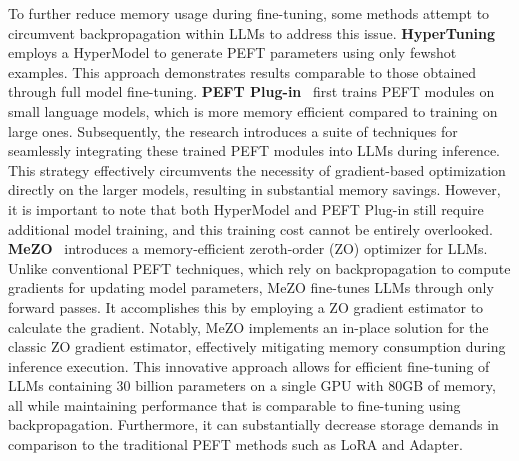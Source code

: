 To further reduce memory usage during fine-tuning, some methods attempt to circumvent backpropagation within LLMs to address this issue. \textbf{HyperTuning}~\cite{hyper-tuning} employs a HyperModel to generate PEFT parameters using only fewshot examples. This approach demonstrates results comparable to those obtained through full model fine-tuning. 
\textbf{PEFT Plug-in}~\cite{jin2023parameter} first trains PEFT modules on small language models, which is more memory efficient compared to training on large ones. Subsequently, the research introduces a suite of techniques for seamlessly integrating these trained PEFT modules into LLMs during inference. This strategy effectively circumvents the necessity of gradient-based optimization directly on the larger models, resulting in substantial memory savings.
However, it is important to note that both HyperModel and PEFT Plug-in still require additional model training, and this training cost cannot be entirely overlooked.
\textbf{MeZO}~\cite{malladi2023fine} introduces a memory-efficient zeroth-order (ZO) optimizer for LLMs. Unlike conventional PEFT techniques, which rely on backpropagation to compute gradients for updating model parameters, MeZO fine-tunes LLMs through only forward passes. It accomplishes this by employing a ZO gradient estimator to calculate the gradient. Notably, MeZO implements an in-place solution for the classic ZO gradient estimator, effectively mitigating memory consumption during inference execution. 
This innovative approach allows for efficient fine-tuning of LLMs containing 30 billion parameters on a single GPU with 80GB of memory, all while maintaining performance that is comparable to fine-tuning using backpropagation. Furthermore, it can substantially decrease storage demands in comparison to the traditional PEFT methods such as LoRA and Adapter. 

